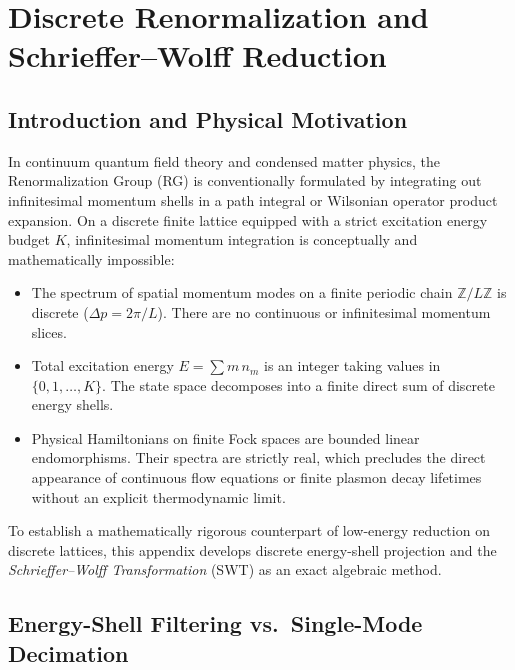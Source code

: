 \chapter[Discrete Renormalization and Schrieffer--Wolff]{Discrete Renormalization and Schrieffer--Wolff Reduction}
\label{app:discrete_rg_sw}

\section{Introduction and Physical Motivation}

In continuum quantum field theory and condensed matter physics, the Renormalization Group (RG) is conventionally formulated by integrating out infinitesimal momentum shells in a path integral or Wilsonian operator product expansion. On a discrete finite lattice equipped with a strict excitation energy budget $K$, infinitesimal momentum integration is conceptually and mathematically impossible:
\begin{itemize}
    \item The spectrum of spatial momentum modes on a finite periodic chain $\mathbb{Z}/L\mathbb{Z}$ is discrete ($\Delta p = 2\pi / L$). There are no continuous or infinitesimal momentum slices.
    \item Total excitation energy $E = \sum m\, n_m$ is an integer taking values in $\{0, 1, \dots, K\}$. The state space decomposes into a finite direct sum of discrete energy shells.
    \item Physical Hamiltonians on finite Fock spaces are bounded linear endomorphisms. Their spectra are strictly real, which precludes the direct appearance of continuous flow equations or finite plasmon decay lifetimes without an explicit thermodynamic limit.
\end{itemize}

To establish a mathematically rigorous counterpart of low-energy reduction on discrete lattices, this appendix develops discrete energy-shell projection and the \emph{Schrieffer--Wolff Transformation} (SWT) as an exact algebraic method.

\section{Energy-Shell Filtering vs.\ Single-Mode Decimation}

